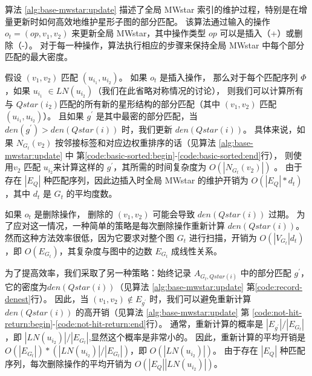     算法 \ref{alg:base-mwstar:update} 描述了全局 MWstar 索引的维护过程，特别是在增量更新时如何高效地维护星形子图的部分匹配。
    该算法通过输入的操作 $o_t = (op, v_1, v_2)$ 来更新全局 MWstar，其中操作类型 $op$ 可以是插入（+）或删除（-）。
    对于每一种操作，算法执行相应的步骤来保持全局 MWstar 中每个部分匹配的最大密度。
    
    假设 $(v_1, v_2)$ 匹配 $(u_{i_1}, u_{i_2})$。
     如果 $o_t$ 是插入操作，
     那么对于每个匹配序列 $\Phi$，如果 $u_{i_1}$ $\in LN(u_{i_2})$（我们在此省略对称情况的讨论），
     则我们可以计算所有与 $Qstar(i_2)$匹配的所有新的星形结构的部分匹配（其中 $(v_1, v_2)$ 匹配 $(u_{i_1}, u_{i_2})$）。
     且如果 $g^\prime$ 是其中最密的部分匹配，当 $den(g^\prime) > den(Qstar(i))$ 时，我们更新 $den(Qstar(i))$。
     具体来说，如果 $N_{G_t}(v_2)$ 按邻接标签和对应边权重排序的话（见算法 \ref{alg:base-mwstar:update} 中 第\ref{code:basic-sorted:begin}-\ref{code:basic-sorted:end}行），
     则使用$v_2$ 匹配 $u_{i_2}$来计算这样的 $g^\prime$，其所需的时间复杂度为 $O(|N_{G_t}(v_2)|)$ 。
     由于存在 $|E_Q|$ 种匹配序列，因此边插入时全局 MWstar 的维护开销为 $O(|E_Q|*d_t)$，其中 $d_t$ 是 $G_t$ 的平均度数。
     
     如果 $o_t$ 是删除操作，
     删除的 $(v_1, v_2)$ 可能会导致 $den(Qstar(i))$ 过期。
     为了应对这一情况，一种简单的策略是每次删除操作重新计算 $den(Qstar(i))$。
     然而这种方法效率很低，因为它要求对整个图 $G_t$ 进行扫描，开销为 $O(|V_{G_t}|d_t)$，即 $O(E_{G_t})$，其复杂度与图中的边数 $E_{G_t}$ 成线性关系。

     为了提高效率，我们采取了另一种策略：始终记录 $A_{G_t, Qstar(i)}$ 中的部分匹配 $g^\prime$，它的密度为$den(Qstar(i))$（见算法 \ref{alg:base-mwstar:update} 第\ref{code:record-denest}行）。
     因此，当 $(v_1, v_2) \notin E_{g^\prime}$ 时，我们可以避免重新计算 $den(Qstar(i))$ 的高开销（见算法 \ref{alg:base-mwstar:update}  第 \ref{code:not-hit-return:begin}-\ref{code:not-hit-return:end}行）。
     通常，重新计算的概率是 $|E_{g^\prime}|/|E_{G_t}|$，即 $|LN(u_{i_2})|/|E_{G_t}|$,显然这个概率是非常小的。
     因此，重新计算的平均开销是 $O(|E_{G_t}|)*(|LN(u_{i_2})|/|E_{G_t}|)$，即 $O(|LN(u_{i_2})|)$。
     由于存在 $|E_Q|$ 种匹配序列，每次删除操作的平均开销为 $O(|E_Q||LN(u_{i_2})|)$。

